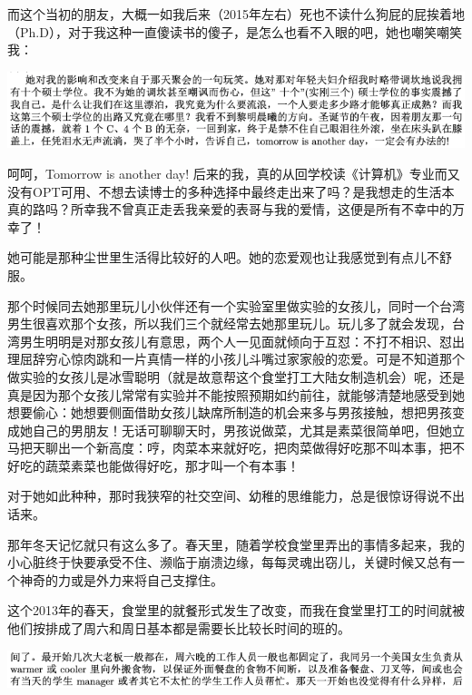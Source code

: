 \documentclass[9pt, b5paper]{article}
\begin{document}
而这个当初的朋友，大概一如我后来（2015年左右）死也不读什么狗屁的屁挨着地（Ph.D），对于我这种一直傻读书的傻子，是怎么也看不入眼的吧，她也嘲笑嘲笑我：

\begin{center}
\includegraphics[width=.9\linewidth]{./pic/backups_plans_20210502_155743.png}
\end{center}

呵呵，Tomorrow is another day! 后来的我，真的从回学校读《计算机》专业而又没有OPT可用、不想去读博士的多种选择中最终走出来了吗？是我想走的生活本真的路吗？所幸我不曾真正走丢我亲爱的表哥与我的爱情，这便是所有不幸中的万幸了！

她可能是那种尘世里生活得比较好的人吧。她的恋爱观也让我感觉到有点儿不舒服。

那个时候同去她那里玩儿小伙伴还有一个实验室里做实验的女孩儿，同时一个台湾男生很喜欢那个女孩，所以我们三个就经常去她那里玩儿。玩儿多了就会发现，台湾男生明明是对那女孩儿有意思，两个人一见面就倾向于互怼：不打不相识、怼出理屈辞穷心惊肉跳和一片真情一样的小孩儿斗嘴过家家般的恋爱。可是不知道那个做实验的女孩儿是冰雪聪明（就是故意帮这个食堂打工大陆女制造机会）呢，还是真是因为那个女孩儿常常有实验并不能按照预期如约前往，就能够清楚地感受到她想要偷心：她想要侧面借助女孩儿缺席所制造的机会来多与男孩接触，想把男孩变成她自己的男朋友！无话可聊聊天时，男孩说做菜，尤其是素菜很简单吧，但她立马把天聊出一个新高度：哼，肉菜本来就好吃，把肉菜做得好吃那不叫本事，把不好吃的蔬菜素菜也能做得好吃，那才叫一个有本事！

对于她如此种种，那时我狭窄的社交空间、幼稚的思维能力，总是很惊讶得说不出话来。

那年冬天记忆就只有这么多了。春天里，随着学校食堂里弄出的事情多起来，我的小心脏终于快要承受不住、濒临于崩溃边缘，每每灵魂出窃儿，关键时候又总有一个神奇的力或是外力来将自己支撑住。

这个2013年的春天，食堂里的就餐形式发生了改变，而我在食堂里打工的时间就被他们按排成了周六和周日基本都是需要长比较长时间的班的。 

\begin{center}
\includegraphics[width=.9\linewidth]{./pic/backups_plans_20210503_221236.png}
\end{center}
\end{document}
